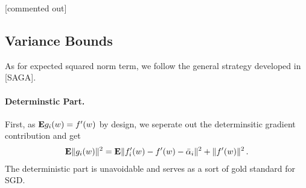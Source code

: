 \documentclass{article}
\newcommand{\E}{{\bf E}}
\begin{document}
[commented out] 


\subsection{Variance Bounds} 

As for expected squared norm term, we follow the general strategy developed in [SAGA].
% 

\paragraph{Determinstic Part.} First, as $\E g_i(w) = f'(w)$ by design, we seperate out the determinsitic gradient contribution and get 
\begin{align}
\E \|g_i(w)\|^2 = \E \| f'_i(w) - f'(w) - \bar \alpha_i  \|^2 + \| f'(w)\|^2 \,.
\end{align}
The deterministic part is unavoidable and serves as a sort of gold standard for SGD.
\end{document}
